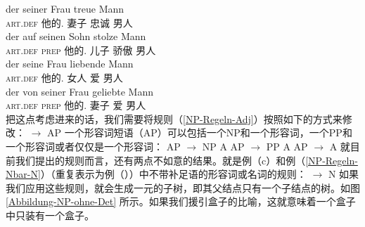 \eal
\ex 
\gll der seiner Frau treue Mann\\
	 \textsc{art}.\textsc{def} 他的.\dat{} 妻子 忠诚 男人\\
\ex 
\gll der auf seinen Sohn stolze Mann\\
	 \textsc{art}.\textsc{def} \textsc{prep} 他的.\acc{} 儿子 骄傲 男人\\
\ex 
\gll der seine Frau liebende Mann\\
	 \textsc{art}.\textsc{def} 他的.\acc{} 女人 爱 男人\\
\ex 
\gll der von seiner Frau geliebte Mann\\
     \textsc{art}.\textsc{def} \textsc{prep} 他的.\dat{} 妻子 爱 男人\\
\zl
把这点考虑进来的话，我们需要将规则（\ref{NP-Regeln-Adj}）按照如下的方式来修改：
\ea
\label{NP-Regeln-AP} 
\nbar $\to$ AP \nbar
\z
一个形容词短语（AP）可以包括一个NP和一个形容词，一个PP和一个形容词或者仅仅是一个形容词：
\eal
\ex AP $\to$ NP A
\ex AP $\to$ PP A
\ex AP $\to$ A
\zl
就目前我们提出的规则而言，还有两点不如意的结果。就是例（c）和例（\ref{NP-Regeln-Nbar-N}）（重复表示为例（））中不带补足语的形容词或名词的规则：
\ea
\nbar $\to$ N
\z
如果我们应用这些规则，就会生成一元的子树，即其父结点只有一个子结点的树。如图\ref{Abbildung-NP-ohne-Det} 所示。如果我们援引盒子的比喻，这就意味着一个盒子中只装有一个盒子。


